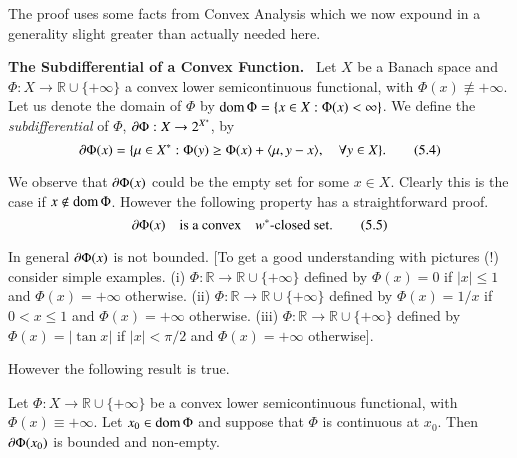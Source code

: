 The proof uses some facts from Convex Analysis which we now expound in
a generality slight greater than actually needed here.

\medskip
\noindent
{\bf The Subdifferential of a Convex Function.}~ Let $X$ be a Banach
space and $\Phi:X\to \mathbb{R}\cup \{+\infty\}$ a convex lower
semicontinuous functional, with $\Phi(x)\nequiv +\infty$. Let us denote
the domain of $\Phi$ by $\operatorname{dom} \Phi=\{x\in X:\Phi(x)<\infty\}$. We
define the {\em subdifferential} of $\Phi$, $\partial \Phi:X\to 2^{X^{*}}$,
by
\begin{equation*}
\partial \Phi(x)=\{\mu\in X^{*}:\Phi(y)\geq \Phi(x)+\langle
\mu,y-x\rangle,\quad \forall y\in X\}.\tag{5.4}\label{chap5-eq5.4}
\end{equation*}

We observe that $\partial\Phi(x)$ could be the empty set for some $x\in
X$. Clearly this is the case if $x\not\in \operatorname{dom} \Phi$. However the
following property has a straightforward proof.
\begin{equation*}
\partial \Phi(x)\quad \text{is a convex}\quad w^{*}\text{-closed
  set.}\tag{5.5}\label{chap5-eq5.5} 
\end{equation*}

In general $\partial\Phi(x)$ is not bounded. [To get a good understanding
  with pictures (!) consider simple examples. (i) $\Phi:\mathbb{R}\to
  \mathbb{R}\cup \{+\infty\}$ defined by $\Phi(x)=0$ if $|x|\leq 1$
  and $\Phi(x)=+\infty$ otherwise. (ii) $\Phi:\mathbb{R}\to
  \mathbb{R}\cup \{+\infty\}$ defined by $\Phi(x)=1/x$ if $0<x\leq 1$
  and $\Phi(x)=+\infty$ otherwise. (iii) $\Phi:\mathbb{R}\to
  \mathbb{R}\cup\{+\infty\}$ defined by $\Phi(x)=|\tan x|$ if
  $|x|<\pi/2$ and $\Phi(x)=+\infty$ otherwise].

However the following result is true.

\begin{proposition}\label{chap5-prop5.2}
Let $\Phi:X\to \mathbb{R}\cup \{+\infty\}$ be a convex lower
semicontinuous functional, with $\Phi(x)\equiv +\infty$. Let $x_{0}\in
\operatorname{dom} \Phi$ and suppose that $\Phi$ is continuous at $x_{0}$. Then
$\partial\Phi(x_{0})$ is bounded and non-empty.
\end{proposition}

